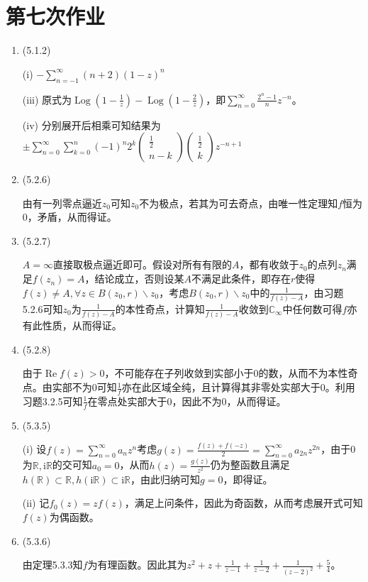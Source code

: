 \documentclass[a4paper,UTF8,fontset=windows]{ctexart}
\DeclareMathOperator{\Log}{Log}
\DeclareMathOperator{\re}{Re}
\begin{document}
\section{第七次作业}
\begin{enumerate}
    \item (5.1.2)
    
    (i) $-\sum_{n=-1}^\infty(n+2)(1-z)^n$
    
    (iii) 原式为$\Log(1-\frac{1}{z})-\Log(1-\frac{2}{z})$，即$\sum_{n=0}^\infty\frac{2^n-1}{n}z^{-n}$。
    
    (iv) 分别展开后相乘可知结果为$\displaystyle\pm\sum_{n=0}^\infty\sum_{k=0}^n(-1)^n2^k\begin{pmatrix}\frac{1}{2}\\n-k\end{pmatrix}\begin{pmatrix}\frac{1}{2}\\k\end{pmatrix}z^{-n+1}$
    
    \item (5.2.6)
    
    由有一列零点逼近$z_0$可知$z_0$不为极点，若其为可去奇点，由唯一性定理知$f$恒为0，矛盾，从而得证。
    
    \item (5.2.7)
    
    $A=\infty$直接取极点逼近即可。假设对所有有限的$A$，都有收敛于$z_0$的点列$z_n$满足$f(z_n)=A$，结论成立，否则设某$A$不满足此条件，即存在$r$使得$f(z)\ne A,\forall z\in B(z_0,r)\backslash z_0$，考虑$B(z_0,r)\backslash z_0$中的$\frac{1}{f(z)-A}$，由习题5.2.6可知$z_0$为$\frac{1}{f(z)-A}$的本性奇点，计算知$\frac{1}{f(z)-A}$收敛到$\mathbb{C}_\infty$中任何数可得$f$亦有此性质，从而得证。
    
    \item (5.2.8)
    
    由于$\re f(z)>0$，不可能存在子列收敛到实部小于0的数，从而不为本性奇点。由实部不为0可知$\frac{1}{f}$亦在此区域全纯，且计算得其非零处实部大于0。利用习题3.2.5可知$\frac{1}{f}$在零点处实部大于0，因此不为0，从而得证。
    
    \item (5.3.5)
    
    (i) 设$f(z)=\sum_{n=0}^\infty a_nz^n$考虑$g(z)=\frac{f(z)+f(-z)}{2}=\sum_{n=0}^\infty a_{2n}z^{2n}$，由于0为$\mathbb{R},\mathrm{i}\mathbb{R}$的交可知$a_0=0$，从而$h(z)=\frac{g(z)}{z^2}$仍为整函数且满足$h(\mathbb{R})\subset\mathbb{R},h(\mathrm{i}\mathbb{R})\subset\mathrm{i}\mathbb{R}$，由此归纳可知$g=0$，即得证。
    
    (ii) 记$f_0(z)=zf(z)$，满足上问条件，因此为奇函数，从而考虑展开式可知$f(z)$为偶函数。
    
    \item (5.3.6)
    
    由定理5.3.3知$f$为有理函数。因此其为$z^2+z+\frac{1}{z-1}+\frac{1}{z-2}+\frac{1}{(z-2)^2}+\frac{5}{4}$。
\end{enumerate}
\end{document}
